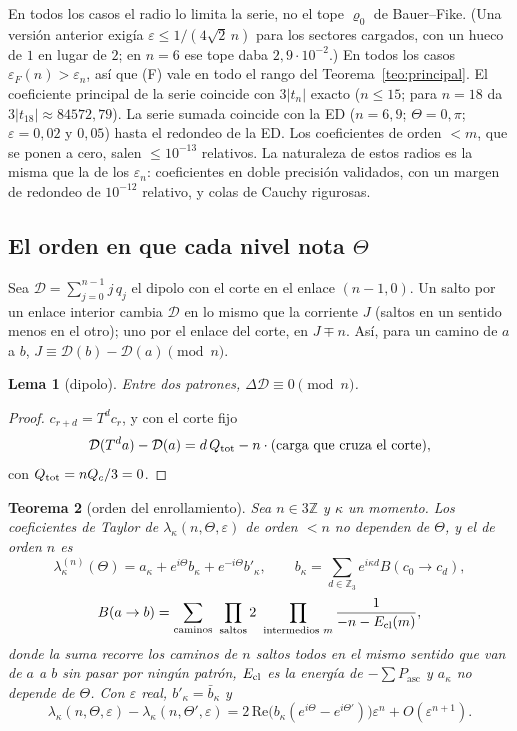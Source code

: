 \documentclass[11pt,a4paper]{article}
\newtheorem{teorema}{Teorema}
\newtheorem{lema}[teorema]{Lema}
\theoremstyle{definition}
\theoremstyle{remark}
\newcommand{\Pasc}{P_{\mathrm{asc}}}
\newcommand{\eps}{\varepsilon}
\begin{document}
\noindent
En todos los casos el radio lo limita la serie, no el tope $\varrho_0$ de Bauer--Fike. (Una versión anterior
exigía $\eps\le1/(4\sqrt2\,n)$ para los sectores cargados, con un hueco de $1$ en lugar de $2$; en $n=6$ ese
tope daba $2{,}9\cdot10^{-2}$.) En todos los casos $\eps_F(n)>\eps_n$, así que (F) vale en
todo el rango del Teorema~\ref{teo:principal}. El coeficiente principal de la serie coincide con $3|t_n|$
exacto ($n\le15$; para $n=18$ da $3|t_{18}|\approx84572{,}79$). La serie sumada coincide con la ED
($n=6,9$; $\Theta=0,\pi$; $\eps=0{,}02$ y $0{,}05$) hasta el redondeo de la ED. Los coeficientes de orden
$<m$, que se ponen a cero, salen $\le10^{-13}$ relativos. La naturaleza de estos radios es la misma que la de
los $\eps_n$: coeficientes en doble precisión validados, con un margen de redondeo de $10^{-12}$ relativo, y
colas de Cauchy rigurosas.

\subsection{El orden en que cada nivel nota $\Theta$}

Sea $\mathcal D=\sum_{j=0}^{n-1}j\,q_j$ el dipolo con el corte en el enlace $(n-1,0)$. Un salto por un enlace
interior cambia $\mathcal D$ en lo mismo que la corriente $J$ (saltos en un sentido menos en el otro); uno por el
enlace del corte, en $J\mp n$. Así, para un camino de $a$ a $b$, $J\equiv\mathcal D(b)-\mathcal D(a)\pmod n$.

\begin{lema}[dipolo]\label{lem:dipolo}
Entre dos patrones, $\Delta\mathcal D\equiv0\pmod n$.
\end{lema}

\begin{proof}
$c_{r+d}=T^dc_r$, y con el corte fijo
\[
  \mathcal D(T^da)-\mathcal D(a)=d\,Q_{\rm tot}-n\cdot(\text{carga que cruza el corte}),
\]
con $Q_{\rm tot}=nQ_c/3=0$.
\end{proof}

\begin{teorema}[orden del enrollamiento]\label{teo:enrollamiento}
Sea $n\in3\mathbb Z$ y $\kappa$ un momento. Los coeficientes de Taylor de $\lambda_\kappa(n,\Theta,\eps)$ de orden
$<n$ no dependen de $\Theta$, y el de orden $n$ es
\[
  \lambda_\kappa^{(n)}(\Theta)=a_\kappa+e^{i\Theta}b_\kappa+e^{-i\Theta}b'_\kappa,\qquad
  b_\kappa=\sum_{d\in\mathbb Z_3}e^{i\kappa d}B(c_0\to c_d),
\]
\[
  B(a\to b)=\sum_{\text{caminos}}\ \prod_{\text{saltos}}2\ \prod_{\text{intermedios }m}\frac1{-n-E_{\rm cl}(m)},
\]
donde la suma recorre los caminos de $n$ saltos todos en el mismo sentido que van de $a$ a $b$ sin pasar
por ningún patrón, $E_{\rm cl}$ es la energía de $-\sum\Pasc$ y $a_\kappa$ no depende de $\Theta$. Con $\eps$ real, $b'_\kappa=\bar b_\kappa$ y
\[
  \lambda_\kappa(n,\Theta,\eps)-\lambda_\kappa(n,\Theta',\eps)=2\,\mathrm{Re}\big(b_\kappa(e^{i\Theta}-e^{i\Theta'})\big)\eps^n+O(\eps^{n+1}).
\]
\end{teorema}
\end{document}
